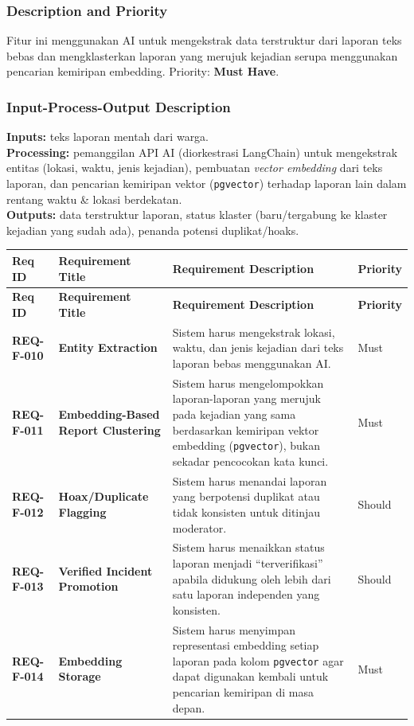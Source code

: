 \documentclass[11pt,a4paper]{article}
\newcommand{\req}[4]{\textbf{#1} & \textbf{#2} & #3 & #4 \\ \hline}
\begin{document}
\subsubsection{Description and Priority}
Fitur ini menggunakan AI untuk mengekstrak data terstruktur dari laporan teks bebas dan mengklasterkan laporan yang merujuk kejadian serupa menggunakan pencarian kemiripan embedding. Priority: \textbf{Must Have}.

\subsubsection{Input-Process-Output Description}
\textbf{Inputs:} teks laporan mentah dari warga.\\
\textbf{Processing:} pemanggilan API AI (diorkestrasi LangChain) untuk mengekstrak entitas (lokasi, waktu, jenis kejadian), pembuatan \textit{vector embedding} dari teks laporan, dan pencarian kemiripan vektor (\texttt{pgvector}) terhadap laporan lain dalam rentang waktu \& lokasi berdekatan.\\
\textbf{Outputs:} data terstruktur laporan, status klaster (baru/tergabung ke klaster kejadian yang sudah ada), penanda potensi duplikat/hoaks.

\begin{longtable}{|L{2.3cm}|L{4.0cm}|L{6.9cm}|L{1.6cm}|}
\hline
{}\textbf{Req ID} & \textbf{Requirement Title} & \textbf{Requirement Description} & \textbf{Priority} \\ \hline
\endfirsthead
\hline
{}\textbf{Req ID} & \textbf{Requirement Title} & \textbf{Requirement Description} & \textbf{Priority} \\ \hline
\endhead
\req{REQ-F-010}{Entity Extraction}{Sistem harus mengekstrak lokasi, waktu, dan jenis kejadian dari teks laporan bebas menggunakan AI.}{Must}
\req{REQ-F-011}{Embedding-Based Report Clustering}{Sistem harus mengelompokkan laporan-laporan yang merujuk pada kejadian yang sama berdasarkan kemiripan vektor embedding (\texttt{pgvector}), bukan sekadar pencocokan kata kunci.}{Must}
\req{REQ-F-012}{Hoax/Duplicate Flagging}{Sistem harus menandai laporan yang berpotensi duplikat atau tidak konsisten untuk ditinjau moderator.}{Should}
\req{REQ-F-013}{Verified Incident Promotion}{Sistem harus menaikkan status laporan menjadi ``terverifikasi'' apabila didukung oleh lebih dari satu laporan independen yang konsisten.}{Should}
\req{REQ-F-014}{Embedding Storage}{Sistem harus menyimpan representasi embedding setiap laporan pada kolom \texttt{pgvector} agar dapat digunakan kembali untuk pencarian kemiripan di masa depan.}{Must}
\end{longtable}
\end{document}
